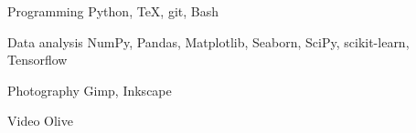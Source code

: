 
\begin{cvskills}

	\cvskill
	{Programming}
    {Python, \TeX, git, Bash}

	\cvskill
	{Data analysis}
    {NumPy, Pandas, Matplotlib, Seaborn, SciPy, scikit-learn, Tensorflow}

	\cvskill
    {Photography}
    {Gimp, Inkscape}

    \cvskill
    {Video}
    {Olive}

\end{cvskills}
